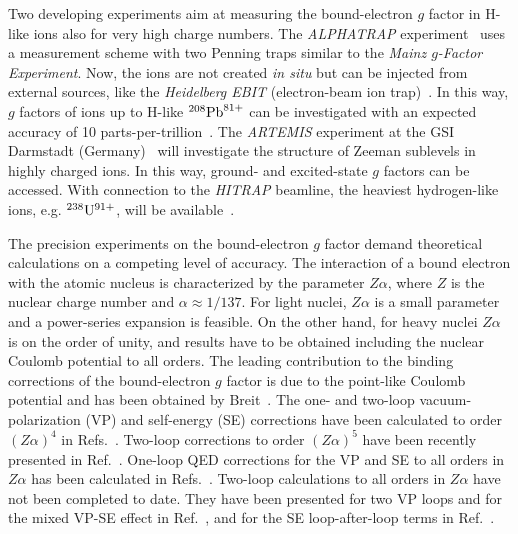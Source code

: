 Two developing experiments aim at measuring the bound-electron $g$ factor in H-like ions also for very high charge numbers. The \textit{ALPHATRAP} experiment~\cite{sturm2017} uses a measurement scheme with two Penning traps similar to the \textit{Mainz $g$-Factor Experiment}. Now, the ions are not created \textit{in situ} but can be injected from external sources, like the \textit{Heidelberg EBIT} (electron-beam ion trap)~\cite{ebit1999}. In this way, $g$ factors of ions up to H-like $^{208}\rm{Pb}^{81+}$ can be investigated with an expected accuracy of 10 parts-per-trillion~\cite{sturm2017}. The \textit{ARTEMIS} experiment at the GSI Darmstadt (Germany)~\cite{vogel2013,sturm2017} will investigate the structure of Zeeman sublevels in highly charged ions. In this way, ground- and excited-state $g$ factors can be accessed. With connection to the \textit{HITRAP} beamline, the heaviest hydrogen-like ions, e.g. $^{238}\rm{U}^{91+}$, will be available~\cite{vogel2015}.

The precision experiments on the bound-electron $g$ factor demand theoretical calculations on a competing level of accuracy. The interaction of a bound electron with the atomic nucleus is characterized by the parameter $Z\alpha$, where $Z$ is the nuclear charge number and $\alpha \approx 1/137$. For light nuclei, $Z\alpha$ is a small parameter and a power-series expansion is feasible. On the other hand, for heavy nuclei $Z\alpha$ is on the order of unity, and results have to be obtained including the nuclear Coulomb potential to all orders. %
The leading contribution to the binding corrections of the bound-electron $g$ factor is due to the point-like Coulomb potential and has been obtained by Breit~\cite{breit1928}.
The one- and two-loop vacuum-polarization (VP) and self-energy (SE) corrections have been calculated to order $(Z\alpha)^4$ in Refs.~\cite{karshenboim2000,Pachucki2004,pachucki2004_err,Pachucki2005,czarnecki2016}. 
Two-loop corrections to order $(Z\alpha)^5$ have been recently presented in Ref.~\cite{czarnecki2018}.
One-loop QED corrections for the VP and SE to all orders in $Z\alpha$ has been calculated in Refs.~\cite{Beier2000,Karshenboim2001,yerokhin2002,Yerokhin2004,Lee2005,Lee2007,yerokhin2008,yerokhin2010,yerokhin2017}.
Two-loop calculations to all orders in $Z\alpha$ have not been completed to date. They have been presented for two VP loops and for the mixed VP-SE effect in Ref.~\cite{yerokhin2013}, and for the SE loop-after-loop terms in Ref.~\cite{sikora2018_arxiv}.

